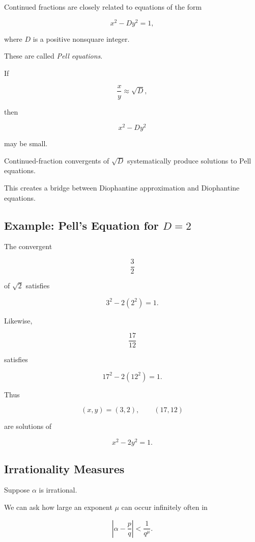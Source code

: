 Continued fractions are closely related to equations of the form

\[ x^2-Dy^2=1, \]

where \(D\) is a positive nonsquare integer.

These are called \emph{Pell equations}.

If

\[ \frac xy\approx\sqrt D, \]

then

\[ x^2-Dy^2 \]

may be small.

Continued-fraction convergents of \(\sqrt D\) systematically produce
solutions to Pell equations.

This creates a bridge between Diophantine approximation and Diophantine
equations.

\subsection{Example: Pell's Equation for \(D=2\)}
\label{subsec:pell-d2}

The convergent

\[ \frac32 \]

of \(\sqrt2\) satisfies

\[ 3^2-2(2^2)=1. \]

Likewise,

\[ \frac{17}{12} \]

satisfies

\[ 17^2-2(12^2)=1. \]

Thus

\[ (x,y)=(3,2),\qquad(17,12) \]

are solutions of

\[ x^2-2y^2=1. \]

\subsection{Irrationality Measures}
\label{subsec:irrationality-measures}

Suppose \(\alpha\) is irrational.

We can ask how large an exponent \(\mu\) can occur infinitely often in

\[ \left|\alpha-\frac pq\right|<\frac1{q^\mu}. \]

